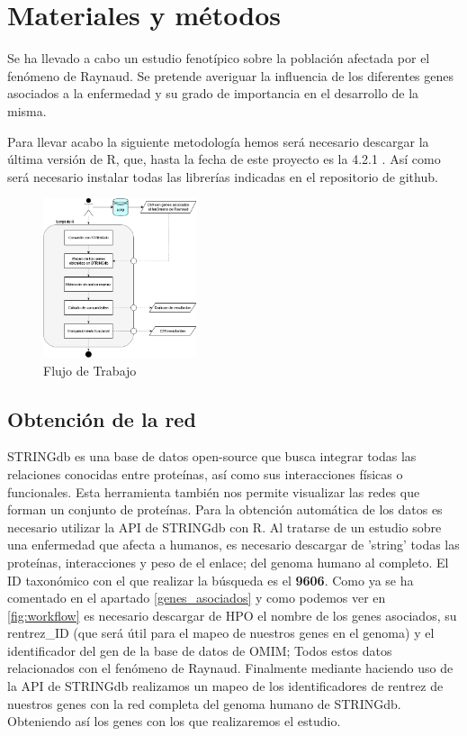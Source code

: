 \section{Materiales y métodos}

Se ha llevado a cabo un estudio fenotípico sobre la población afectada por el fenómeno de Raynaud. Se pretende averiguar la influencia de los diferentes genes asociados a la enfermedad y su grado de importancia en el desarrollo de la misma.

Para llevar acabo la siguiente metodología hemos será necesario descargar la última versión de R, que, hasta la fecha de este proyecto es la 4.2.1 . Así como será necesario instalar todas las librerías indicadas en el repositorio de github.

\begin{figure}
	\centering
	\includegraphics[width=0.4\textwidth]{figures/Workflow_genes.PNG}
	\caption{Flujo de Trabajo}
	\label{workflow}
\end{figure}

\subsection{Obtención de la red}
\label{obtencion_red}
STRINGdb es una base de datos open-source que busca integrar todas las relaciones conocidas entre proteínas, así como sus interacciones físicas o funcionales. Esta herramienta también nos permite visualizar las redes que forman un conjunto de proteínas. Para la obtención automática de los datos es necesario utilizar la API de STRINGdb con R. Al tratarse de un estudio sobre una enfermedad que afecta a humanos, es necesario descargar de 'string' todas las proteínas, interacciones y peso de el enlace; del genoma humano al completo. El ID taxonómico con el que realizar la búsqueda es el \textbf{9606}. Como ya se ha comentado en el apartado \ref{genes_asociados} y como podemos ver en \ref{fig:workflow} es necesario descargar de HPO el nombre de los genes asociados, su rentrez\_ID (que será útil para el mapeo de nuestros genes en el genoma) y el identificador del gen de la base de datos de OMIM; Todos estos datos relacionados con el fenómeno de Raynaud. Finalmente mediante haciendo uso de la API de STRINGdb realizamos un mapeo de los identificadores de rentrez de nuestros genes con la red completa del genoma humano de STRINGdb. Obteniendo así los genes con los que realizaremos el estudio.

